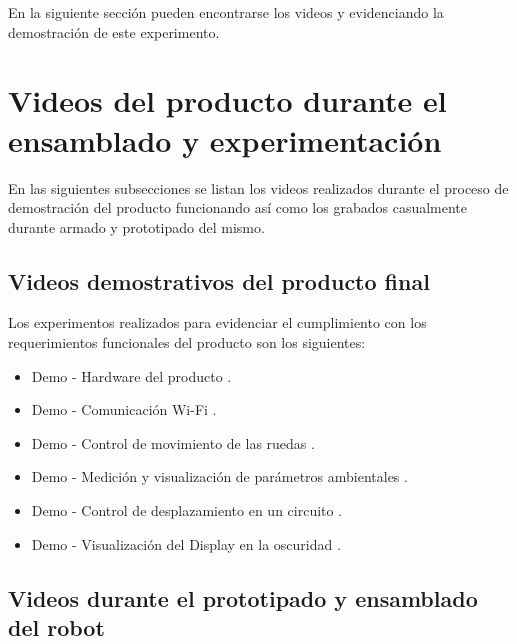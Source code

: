 En la siguiente sección pueden encontrarse los videos \cite{Demo_Control_Movimiento_1} y \cite{Demo_Control_Movimiento_2} evidenciando la demostración de este experimento.



\section{Videos del producto durante el ensamblado y experimentación}

En las siguientes subsecciones se listan los videos realizados durante el proceso de demostración del producto funcionando así como los grabados casualmente durante armado y prototipado del mismo.


\subsection{Videos demostrativos del producto final}

Los experimentos realizados para evidenciar el cumplimiento con los requerimientos funcionales del producto son los siguientes:
\begin{itemize}
	\item Demo - Hardware del producto \cite{Demo_Hardware}.
	\item Demo - Comunicación Wi-Fi \cite{Demo_ComWifi}.
	\item Demo - Control de movimiento de las ruedas \cite{Demo_Control_Movimiento_1}.
	\item Demo - Medición y visualización de parámetros ambientales \cite{Demo_Mediciones}.
	\item Demo - Control de desplazamiento en un circuito \cite{Demo_Control_Movimiento_2}.
	\item Demo - Visualización del Display en la oscuridad \cite{Demo_Display_Oscuridad}.
	
\end{itemize}


\subsection{Videos durante el prototipado y ensamblado del robot}

